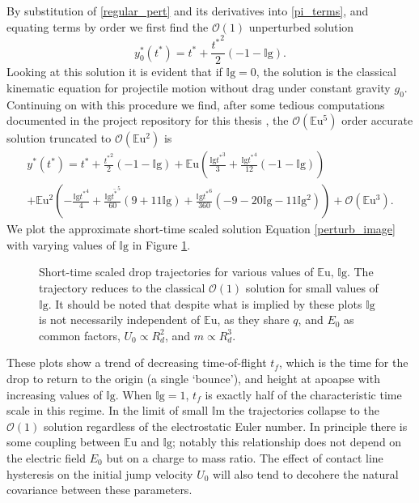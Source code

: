 \documentclass[12pt,a4paper,oneside]{book}
\begin{document}
By substitution of \ref{regular_pert} and its derivatives into \ref{pi_terms}, and equating terms by order we first find the $\mathcal{O}(1)$ unperturbed solution
\[{y^*_{0}}{\left ({t^*} \right )} = {t^*} + \frac{{t^*}^{2}}{2} \left(-1 - \mathbb{I}\mbox{g}\right). \]
Looking at this solution it is evident that if $\mathbb{I}\mbox{g}=0$, the solution is the classical kinematic equation for projectile motion without drag under constant gravity $g_0$. Continuing on with this procedure we find, after some tedious computations documented in the project repository for this thesis \cite{schmidt_droplet_electro-bounce:_2017}, the $\mathcal{O}(\mathbb{E}\mbox{u}^5)$ order accurate solution truncated to $\mathcal{O}(\mathbb{E}\mbox{u}^2)$ is
\begin{eqnarray}
\label{perturb_image}
&{y^*}({t^*}) = {t^*} + \frac{{t^*}^{2}}{2} \left(-1 - \mathbb{I}\mbox{g}\right) + \mathbb{E}\mbox{u} \left(\frac{\mathbb{I}\mbox{g} {t^*}^{3}}{3} + \frac{\mathbb{I}\mbox{g} {t^*}^{4}}{12} \left(-1 - \mathbb{I}\mbox{g} \right)\right)& \\
&+ \mathbb{E}\mbox{u}^{2} \left(- \frac{\mathbb{I}\mbox{g} {t^*}^{4}}{4} + \frac{\mathbb{I}\mbox{g} \bar{t^*}^{5}}{60} \left(9 + 11 \mathbb{I}\mbox{g} \right) + \frac{\mathbb{I}\mbox{g} {t^*}^{6}}{360} \left(-9 - 20 \mathbb{I}\mbox{g} - 11 \mathbb{I}\mbox{g}^{2}\right)\right) + \mathcal{O}(\mathbb{E}\mbox{u}^3).&\nonumber
\end{eqnarray}
We plot the approximate short-time scaled solution Equation \ref{perturb_image} with varying values of $\mathbb{I}\mbox{g}$ in Figure \ref{fig:short_times}.
\begin{figure}[htb]
    \centering
    \resizebox{1\textwidth}{!}{}
    \caption{Short-time scaled drop trajectories for various values of $\mathbb{E}\mbox{u}$, $\mathbb{I}\mbox{g}$. The trajectory reduces to the classical $\mathcal{O}(1)$ solution for small values of $\mathbb{I}\mbox{g}$. It should be noted that despite what is implied by these plots $\mathbb{I}\mbox{g}$ is not necessarily independent of $\mathbb{E}\mbox{u}$, as they share $q$, and $E_0$ as common factors, $U_0 \propto R_d^2$, and $m \propto R_d^3$.}
    \label{fig:short_times}
\end{figure}
These plots show a trend of decreasing time-of-flight $t_f$, which is the time for the drop to return to the origin (a single `bounce'), and height at apoapse with increasing values of $\mathbb{I}\mbox{g}$. When $\mathbb{I}\mbox{g} = 1$, $t_f$ is exactly half of the characteristic time scale in this regime. In the limit of small $\mathbb{I}\mbox{m}$ the trajectories collapse to the $\mathcal{O}(1)$ solution regardless of the electrostatic Euler number. In principle there is some coupling between $\mathbb{E}\mbox{u}$ and $\mathbb{I}\mbox{g}$; notably this relationship does not depend on the electric field $E_0$ but on a charge to mass ratio. The effect of contact line hysteresis on the initial jump velocity $U_0$ will also tend to decohere the natural covariance between these parameters.
\end{document}
